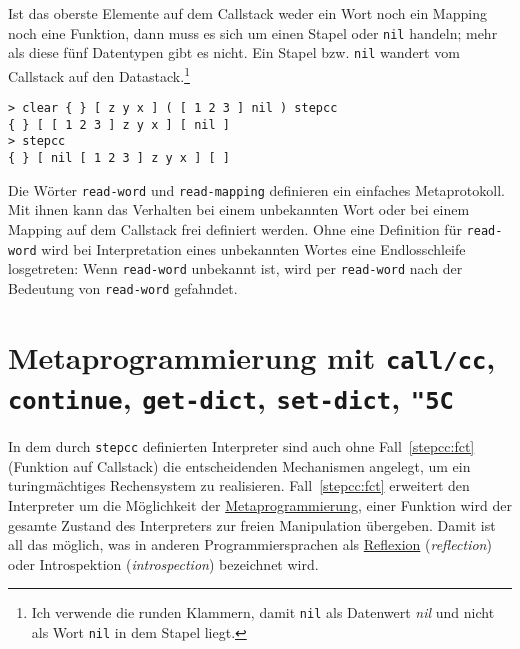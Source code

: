 Ist das oberste Elemente auf dem Callstack weder ein Wort noch ein Mapping noch eine Funktion, dann muss es sich um einen Stapel oder \verb|nil| handeln; mehr als diese fünf Datentypen gibt es nicht. Ein Stapel bzw. \verb|nil| wandert vom Callstack auf den Datastack.\footnote{Ich verwende die runden Klammern, damit \texttt{nil} als Datenwert \textit{nil} und nicht als Wort \texttt{nil} in dem Stapel liegt.}

\begin{verbatim}
> clear { } [ z y x ] ( [ 1 2 3 ] nil ) stepcc
{ } [ [ 1 2 3 ] z y x ] [ nil ]
> stepcc
{ } [ nil [ 1 2 3 ] z y x ] [ ]
\end{verbatim}


Die Wörter \verb|read-word| und \verb|read-mapping| definieren ein einfaches Metaprotokoll. Mit ihnen kann das Verhalten bei einem unbekannten Wort oder bei einem Mapping auf dem Callstack frei definiert werden. Ohne eine Definition für \verb|read-word| wird bei Interpretation eines unbekannten Wortes eine Endlosschleife losgetreten: Wenn \verb|read-word| unbekannt ist, wird per \verb|read-word| nach der Bedeutung von \verb|read-word| gefahndet.

\section{Metaprogrammierung mit \texttt{call/cc}, \texttt{continue}, \texttt{get-dict}, \texttt{set-dict}, \texttt{{\char "5C}}}
\label{sec:core.meta}

In dem durch \verb|stepcc| definierten Interpreter sind auch ohne Fall~\ref{stepcc:fct} (Funktion auf Callstack) die entscheidenden Mechanismen angelegt, um ein turingmächtiges Rechensystem zu realisieren. Fall~\ref{stepcc:fct} erweitert den Interpreter um die Möglichkeit der \href{http://de.wikipedia.org/wiki/Metaprogrammierung}{Metaprogrammierung}, einer Funktion wird der gesamte Zustand des Interpreters zur freien Manipulation übergeben. Damit ist all das möglich, was in anderen Programmiersprachen als \href{http://de.wikipedia.org/wiki/Reflexion_(Programmierung)}{Reflexion} (\emph{reflection}) oder Introspektion (\emph{introspection}) bezeichnet wird.

